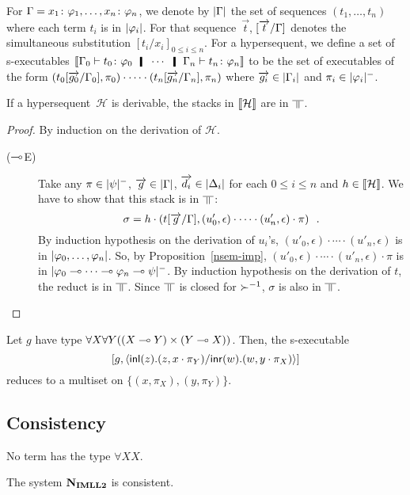 For $\Gamma = {x_1} \colon{\varphi_1},\ldots,{x_n} \colon{\varphi_n}$,
we denote by $|{\Gamma}|$ the set of sequences $(t_1,\dots,t_n)$
 where each term $t_i$ is in $|{\varphi_i}|$.
For that sequence~$\vec t$, $[\overrightarrow{t}/\Gamma]$ denotes the simultaneous substitution
$[t_i/x_i]_{0\le i \le n}$.
For a hypersequent, we
define a set of s-executables
$
\semo{\G_0\tr\tj{t_0}{\phi_0}\hmid\cdots\hmid\G_n\tr\tj{t_n}{\phi_n}}
$
to be the set of executables of the form
$
\left(t_0[\overrightarrow{g_0}/\Gamma_0],\pi_0\right)\cdot\cdots\cdot
\left(t_n[\overrightarrow{g_n}/\Gamma_n],\pi_n\right)
$
 where
$\overrightarrow{g_i} \in |{\Gamma_i}|$ and $\pi_i\in |{\varphi_i}|^-$.

 \begin{theorem}[Adequacy]
  If a hypersequent~$\mathcal H$ is derivable, the stacks in $\llbracket{\mathcal
  H}\rrbracket$ are in $\bbot$.
 \end{theorem}
  \begin{proof}
   By induction on the derivation of $\mathcal{H}$.
   \begin{description}
    \item[($\multimap$E)]
	 Take any $\pi\in|{\psi}|^-$, $\overrightarrow g\in|{\Gamma}|$,
	 $\overrightarrow{d_i}\in|{\Delta_i}|$ for each $0\le i\le n$ and
	 $h\in\llbracket{\mathcal H}\rrbracket$.
	 We have to show that this stack is in $\bbot$:
	 \[
	 \sigma = h\cdot \left(t[\overrightarrow g/\Gamma],
	 (u'_0,\epsilon)\cdot\cdots\cdot (u'_n,\epsilon)\cdot \pi\right)\enspace.
	 \]
	 By induction hypothesis on the derivation of $u_i$'s,
	 $ (u'_0,\epsilon)\cdot\cdots\cdot (u'_n,\epsilon) $ is in
	 $|{\varphi_0,\ldots,\varphi_n}|$.
	 So, by Proposition~\ref{nsem-imp},
	 $(u'_0,\epsilon)\cdot\cdots\cdot (u'_n,\epsilon)\cdot \pi$ is
	 in $|{\varphi_0\multimap\cdots\multimap\varphi_n\multimap\psi}|^-$.
	 By induction hypothesis on the derivation of $t$,
	 the reduct is in $\bbot$.
	 Since $\bbot$ is closed for ${\succ}^{-1}$, $\sigma$ is also in $\bbot$.
   \end{description}
  \end{proof}

  \begin{proposition}
   Let $g$ have type ${\forall X\forall
   Y((X\multimap Y)\times (Y\multimap X))}$.
   Then, the s-executable
   \[
   [g, \langle \mathsf{inl}({z}). ({z},{x\cdot\pi_Y})/ \mathsf{inr}({w}). ({w},{y\cdot\pi_X})\rangle]
   \]
   reduces to a multiset on
   $\{(x,\pi_X), (y,\pi_Y)\}$.
  \end{proposition}

\subsection{Consistency}

\begin{proposition}
  No term has the type $\forall X X$.
\end{proposition}
\begin{corollary}
 The system $\mathbf{N}_{\mathbf{IMLL2}}$ is consistent.
\end{corollary}
